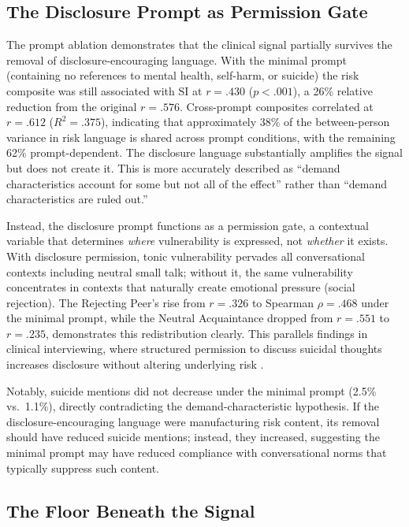 \documentclass[review,12pt,authoryear]{elsarticle}
\begin{document}
\subsection{The Disclosure Prompt as Permission Gate}

The prompt ablation demonstrates that the clinical signal partially survives the removal of disclosure-encouraging language. With the minimal prompt (containing no references to mental health, self-harm, or suicide) the risk composite was still associated with SI at $r = .430$ ($p < .001$), a 26\% relative reduction from the original $r = .576$. Cross-prompt composites correlated at $r = .612$ ($R^2 = .375$), indicating that approximately 38\% of the between-person variance in risk language is shared across prompt conditions, with the remaining 62\% prompt-dependent. The disclosure language substantially amplifies the signal but does not create it. This is more accurately described as ``demand characteristics account for some but not all of the effect'' rather than ``demand characteristics are ruled out.''

Instead, the disclosure prompt functions as a permission gate, a contextual variable that determines \textit{where} vulnerability is expressed, not \textit{whether} it exists. With disclosure permission, tonic vulnerability pervades all conversational contexts including neutral small talk; without it, the same vulnerability concentrates in contexts that naturally create emotional pressure (social rejection). The Rejecting Peer's rise from $r = .326$ to Spearman $\rho = .468$ under the minimal prompt, while the Neutral Acquaintance dropped from $r = .551$ to $r = .235$, demonstrates this redistribution clearly. This parallels findings in clinical interviewing, where structured permission to discuss suicidal thoughts increases disclosure without altering underlying risk \citep{dazzi2014asking}.

Notably, suicide mentions did not decrease under the minimal prompt (2.5\% vs.\ 1.1\%), directly contradicting the demand-characteristic hypothesis. If the disclosure-encouraging language were manufacturing risk content, its removal should have reduced suicide mentions; instead, they increased, suggesting the minimal prompt may have reduced compliance with conversational norms that typically suppress such content.

\subsection{The Floor Beneath the Signal}
\end{document}
